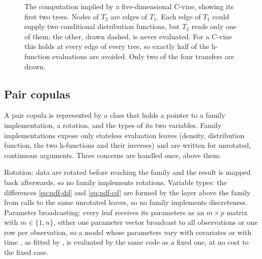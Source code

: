 \documentclass[article]{jss}
\begin{document}
\begin{figure}[t!]
  \caption{The computation implied by a five-dimensional C-vine, showing its
  first two trees.  Nodes of $T_2$ are edges of $T_1$.  Each edge of $T_1$
  could supply two conditional distribution functions, but $T_2$ reads only one
  of them; the other, drawn dashed, is never evaluated.  For a C-vine this
  holds at every edge of every tree, so exactly half of the h-function
  evaluations are avoided.  Only two of the four transfers are drawn.}
  \label{fig:decomposition}
\end{figure}

\subsection{Pair copulas}\label{sec:bicop-engine}

A pair copula is represented by a class  that holds a pointer to a
family implementation, a rotation, and the types of its two variables.  Family
implementations expose only stateless evaluation leaves (density,
distribution function, the two h-functions and their inverses) and are
written for unrotated, continuous arguments.  Three concerns are handled once,
above them:

Rotation: data are rotated before reaching the family and the result is
mapped back afterwards, so no family implements rotations.  Variable types:
the differences \eqref{eq:pdf-dd} and \eqref{eq:pdf-cd} are formed by the
layer above the family from calls to the same unrotated leaves, so no family
implements discreteness.  Parameter broadcasting: every leaf receives its
parameters as an $m \times p$ matrix with $m \in \{1, n\}$, either one
parameter vector broadcast to all observations or one row per observation, so
a model whose parameters vary with covariates or with time
\citep{patton2006, almeida2012, vatter2018}, as fitted by 
\citep{gamCopula}, is evaluated by the same code as a fixed one, at no cost
to the fixed case.
\end{document}
